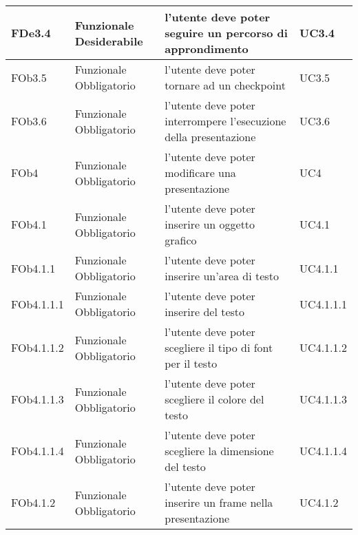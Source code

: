 \begin{longtable}{|l|p{2.5cm}|p{5cm}|p{3.5cm}|}
\hline
FDe3.4 & Funzionale \linebreak Desiderabile & l'utente deve poter seguire un percorso di approndimento & UC3.4 \linebreak  \\
\hline
FOb3.5 & Funzionale \linebreak Obbligatorio & l'utente deve poter tornare ad un checkpoint & UC3.5 \linebreak  \\
\hline
FOb3.6 & Funzionale \linebreak Obbligatorio & l'utente deve poter interrompere l'esecuzione della presentazione & UC3.6 \linebreak  \\
\hline
FOb4 & Funzionale \linebreak Obbligatorio & l'utente deve poter modificare una presentazione & UC4 \linebreak \\
\hline
FOb4.1 & Funzionale \linebreak Obbligatorio & l'utente deve poter inserire un oggetto grafico & UC4.1 \linebreak  \\
\hline
FOb4.1.1 & Funzionale \linebreak Obbligatorio & l'utente deve poter inserire un'area di testo & UC4.1.1 \linebreak  \\
\hline
FOb4.1.1.1 & Funzionale \linebreak Obbligatorio & l'utente deve poter inserire del testo & UC4.1.1.1 \linebreak  \\
\hline
FOb4.1.1.2 & Funzionale \linebreak Obbligatorio & l'utente deve poter scegliere il tipo di font per il testo & UC4.1.1.2 \linebreak  \\
\hline
FOb4.1.1.3 & Funzionale \linebreak Obbligatorio & l'utente deve poter scegliere il colore del testo & UC4.1.1.3 \linebreak  \\
\hline
FOb4.1.1.4 & Funzionale \linebreak Obbligatorio & l'utente deve poter scegliere la dimensione del testo & UC4.1.1.4 \linebreak  \\
\hline
FOb4.1.2 & Funzionale \linebreak Obbligatorio & l'utente deve poter inserire un frame nella presentazione & UC4.1.2 \linebreak  \\

\end{longtable}
